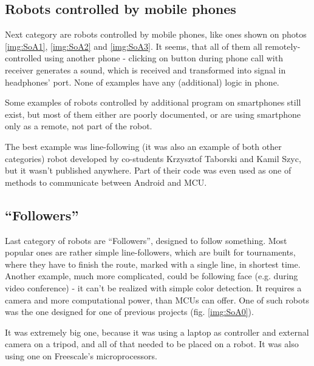 \subsection{Robots controlled by mobile phones}
Next category are robots controlled by mobile phones, like ones shown on photos
\ref{img:SoA1}, \ref{img:SoA2} and \ref{img:SoA3}.
It seems, that all of them all remotely-controlled using another phone -
clicking on button during phone call with receiver generates a sound, which is received and transformed into
signal in headphones' port.
None of examples have any (additional) logic in phone. 

Some examples of robots controlled by additional program on smartphones
still exist, but most of them either are poorly documented, or are using
smartphone only as a remote, not part of the robot. 

The best example was line-following (it was also an example of both other
categories) robot developed by co-students Krzysztof Taborski and Kamil Szyc,
but it wasn't published anywhere.
Part of their code was even used as one of methods to communicate between
Android and MCU.


\clearpage

\subsection{``Followers''}
Last category of robots are ``Followers'', designed to follow something.
Most popular ones are rather simple line-followers, which are built for
tournaments, where they have to finish the route, marked with a single line, in
shortest time.
Another example, much more complicated, could be following face (e.g. during
video conference) - it can't be realized with simple color detection. 
It requires a camera and more computational power, than MCUs can offer.
One of such robots was the one designed for one of previous projects (fig.
\ref{img:SoA0}). 

It was extremely big one, because it was using a laptop as controller
and external camera on a tripod, and all of that needed to be placed on a robot.
It was also using one on Freescale's microprocessors.

